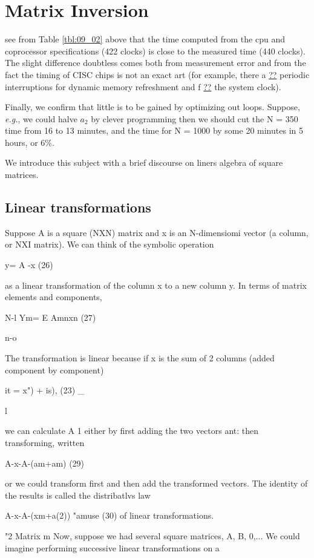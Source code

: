 
\section{Matrix Inversion}
 see from Table \ref{tbl:09_02} above that the time computed from the
cpu and coprocessor specifications (422 clocks) is close to the
measured time (440 clocks). The slight difference doubtless
comes both from measurement error and from the fact the
timing of CISC chips is not an exact art (for example, there a \underline{??}
periodic interruptions for dynamic memory refreshment and f \underline{??}
the system clock).

Finally, we confirm that little is to be gained by optimizing out
loops. Suppose, \textit{e.g.}, we could halve $a_2$ by clever programming
then we should cut the N = 350 time from 16 to 13 minutes, and 
the time for N = 1000 by some 20 minutes in 5 hours, or 6\%.

We introduce this subject with a brief discourse on liners
algebra of square matrices.

\subsection{Linear transformations}
Suppose A is a square (NXN) matrix and x is an N-dimensiomi
vector (a column, or NXI matrix). We can think of the symbolic
operation

y= A -x (26)

 

as a linear transformation of the column x to a new column y. In
terms of matrix elements and components,

N-l
Ym= E Amnxn (27)

n-o

The transformation is linear because if x is the sum of 2 columns
(added component by component)

it = x") + is), (23) \_

l

we can calculate A 1 either by first adding the two vectors ant:
then transforming, written

A-x-A-(am+am) (29)

or we could transform first and then add the transformed vectors.
The identity of the results is called the distribatlvs law

A-x-A-(xm+a(2)) "amuse (30)
of linear transformations.

"2 Matrix m
Now, suppose we had several square matrices, A, B, 0,... We
could imagine performing successive linear transformations on a

